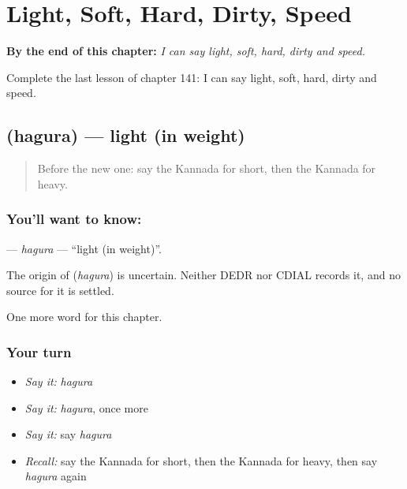 
\chapter{Light, Soft, Hard, Dirty, Speed}
\label{ch:ka-light-soft-hard-dirty-speed}

\begin{chapteropening}
\textbf{By the end of this chapter:} \emph{I can say light, soft, hard, dirty and speed.}

Complete the last lesson of chapter 141: I can say light, soft, hard, dirty and speed.
\end{chapteropening}

\section[\texorpdfstring{\kn{ಹಗುರ} (hagura)}{ಹಗುರ (hagura)}]{ (hagura) — light (in weight)}

\label{lesson:KA-C141-hagura}



\begin{quote}
Before the new one: say the Kannada for short, then the Kannada for heavy.
\end{quote}

\subsection*{You'll want to know: }
\textbf{} — \emph{hagura} — \textquotedblleft{}light (in weight)\textquotedblright{}.

\begin{cousinweb}
The origin of \textbf{} (\emph{hagura}) is uncertain. Neither DEDR nor CDIAL records it, and no source for it is settled.
\end{cousinweb}

\begin{grammarlens}[title={What you've built}]
One more word for this chapter.
\end{grammarlens}

\subsection*{Your turn}
\begin{itemize}
\raggedright
  \item \emph{Say it:} \emph{hagura}
  \item \emph{Say it:} \emph{hagura}, once more
  \item \emph{Say it:} say \emph{hagura}
  \item \emph{Recall:} say the Kannada for short, then the Kannada for heavy, then say \emph{hagura} again
\end{itemize}

